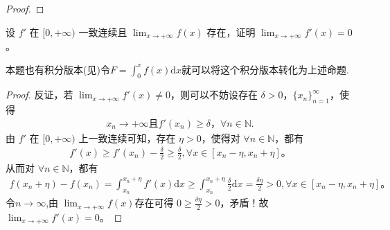 \documentclass[../../main.tex]{subfiles}
\begin{document}
\begin{proof}
\end{proof}

\begin{proposition}\label{proposition:经典导数一致连续问题}
设 $f'$ 在 $[0,+\infty)$ 一致连续且 $\lim_{x \to +\infty} f(x)$ 存在，证明 $\lim_{x \to +\infty} f'(x) = 0$。
\end{proposition}
\begin{note}
本题也有积分版本(见)令$F=\int_0^x{f\left( x \right) \mathrm{d}x}$就可以将这个积分版本转化为上述命题.
\end{note}
\begin{proof}
反证，若 $\lim_{x\rightarrow +\infty} f'(x) \ne 0$，则可以不妨设存在 $\delta >0$，$\{ x_n \}_{n=1}^{\infty}$，使得
\begin{align*}
x_n\rightarrow +\infty \text{且} f'(x_n) \geqslant \delta，\forall n\in \mathbb{N}.    
\end{align*}
由 $f'$ 在 $[0,+\infty)$ 上一致连续可知，存在 $\eta >0$，使得对 $\forall n\in \mathbb{N}$，都有
\begin{align*}
f'(x) \geqslant f'(x_n) -\frac{\delta}{2} \geqslant \frac{\delta}{2}, \forall x\in [x_n-\eta ,x_n+\eta] 。
\end{align*}
从而对 $\forall n\in \mathbb{N}$，都有
\begin{align*}
f(x_n+\eta) -f(x_n) =\int_{x_n}^{x_n+\eta} f'(x) \mathrm{d}x \geqslant \int_{x_n}^{x_n+\eta} \frac{\delta}{2} \mathrm{d}x = \frac{\delta \eta}{2} > 0, \forall x\in [x_n-\eta ,x_n+\eta] 。
\end{align*}
令$n\rightarrow \infty$,由 $\lim_{x\rightarrow +\infty} f(x) $存在可得 $0 \geqslant \frac{\delta \eta}{2} > 0$，矛盾！故 $\lim_{x\rightarrow +\infty} f'(x) =0$。

\end{proof}
\end{document}
